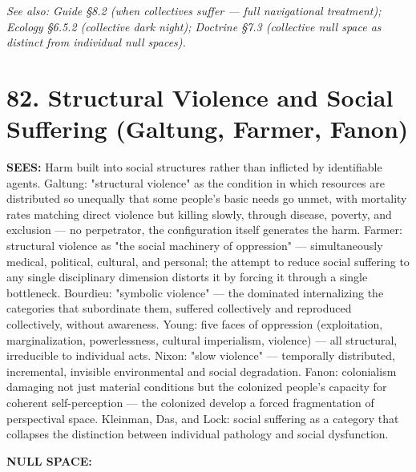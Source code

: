 \textit{See also: Guide §8.2 (when collectives suffer — full navigational treatment); Ecology §6.5.2 (collective dark night); Doctrine §7.3 (collective null space as distinct from individual null spaces).}


\bigskip\noindent\makebox[\textwidth]{\color{rulegray}\rule{5cm}{0.3pt}}\bigskip


\section*{82. Structural Violence and Social Suffering (Galtung, Farmer, Fanon)}


\textbf{SEES:} Harm built into social structures rather than inflicted by identifiable agents. Galtung: "structural violence" as the condition in which resources are distributed so unequally that some people's basic needs go unmet, with mortality rates matching direct violence but killing slowly, through disease, poverty, and exclusion — no perpetrator, the configuration itself generates the harm. Farmer: structural violence as "the social machinery of oppression" — simultaneously medical, political, cultural, and personal; the attempt to reduce social suffering to any single disciplinary dimension distorts it by forcing it through a single bottleneck. Bourdieu: "symbolic violence" — the dominated internalizing the categories that subordinate them, suffered collectively and reproduced collectively, without awareness. Young: five faces of oppression (exploitation, marginalization, powerlessness, cultural imperialism, violence) — all structural, irreducible to individual acts. Nixon: "slow violence" — temporally distributed, incremental, invisible environmental and social degradation. Fanon: colonialism damaging not just material conditions but the colonized people's capacity for coherent self-perception — the colonized develop a forced fragmentation of perspectival space. Kleinman, Das, and Lock: social suffering as a category that collapses the distinction between individual pathology and social dysfunction.


\textbf{NULL SPACE:}

